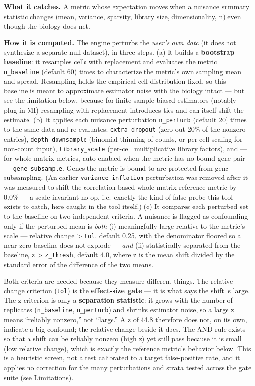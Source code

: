 \documentclass[
  11pt,
]{article}
\begin{document}
\textbf{What it catches.} A metric whose expectation moves when a
nuisance summary statistic changes (mean, variance, sparsity, library
size, dimensionality, n) even though the biology does not.

\textbf{How it is computed.} The engine perturbs the \emph{user's own
data} (it does not synthesize a separate null dataset), in three steps.
(a) It builds a \textbf{bootstrap baseline}: it resamples cells with
replacement and evaluates the metric \texttt{n\_baseline} (default 60)
times to characterize the metric's own sampling mean and spread.
Resampling holds the empirical cell distribution fixed, so this baseline
is meant to approximate estimator noise with the biology intact --- but
see the limitation below, because for finite-sample-biased estimators
(notably plug-in MI) resampling with replacement introduces ties and can
itself shift the estimate. (b) It applies each nuisance perturbation
\texttt{n\_perturb} (default 20) times to the same data and
re-evaluates: \texttt{extra\_dropout} (zero out 20\% of the nonzero
entries), \texttt{depth\_downsample} (binomial thinning of counts, or
per-cell scaling for non-count input), \texttt{library\_scale} (per-cell
multiplicative library factors), and --- for whole-matrix metrics,
auto-enabled when the metric has no bound gene pair ---
\texttt{gene\_subsample}. Genes the metric is bound to are protected
from gene-subsampling. (An earlier \texttt{variance\_inflation}
perturbation was removed after it was measured to shift the
correlation-based whole-matrix reference metric by 0.0\% --- a
scale-invariant no-op, i.e.~exactly the kind of false probe this tool
exists to catch, here caught in the tool itself.) (c) It compares each
perturbed set to the baseline on two independent criteria. A nuisance is
flagged as confounding only if the perturbed mean is \emph{both} (i)
meaningfully large relative to the metric's scale --- relative change
\textgreater{} \texttt{tol}, default 0.25, with the denominator floored
so a near-zero baseline does not explode --- \emph{and} (ii)
statistically separated from the baseline, z \textgreater{}
\texttt{z\_thresh}, default 4.0, where z is the mean shift divided by
the standard error of the difference of the two means.

Both criteria are needed because they measure different things. The
relative-change criterion (\texttt{tol}) is the \textbf{effect-size
gate} --- it is what says the shift is large. The z criterion is only a
\textbf{separation statistic}: it grows with the number of replicates
(\texttt{n\_baseline}, \texttt{n\_perturb}) and shrinks estimator noise,
so a large z means ``reliably nonzero,'' not ``large.'' A z of 44.8
therefore does not, on its own, indicate a big confound; the relative
change beside it does. The AND-rule exists so that a shift can be
reliably nonzero (high z) yet still pass because it is small (low
relative change), which is exactly the reference metric's behavior
below. This is a heuristic screen, not a test calibrated to a target
false-positive rate, and it applies no correction for the many
perturbations and strata tested across the gate suite (see Limitations).
\end{document}
